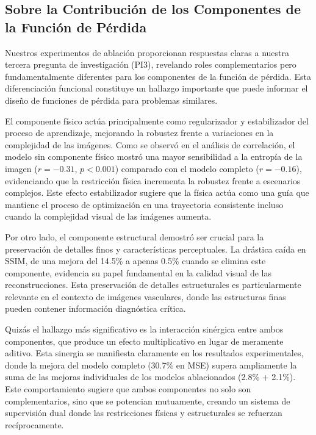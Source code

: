 \subsection{Sobre la Contribución de los Componentes de la Función de Pérdida}

Nuestros experimentos de ablación proporcionan respuestas claras a nuestra tercera pregunta de investigación (PI3), revelando roles complementarios pero fundamentalmente diferentes para los componentes de la función de pérdida. Esta diferenciación funcional constituye un hallazgo importante que puede informar el diseño de funciones de pérdida para problemas similares.

El componente físico actúa principalmente como regularizador y estabilizador del proceso de aprendizaje, mejorando la robustez frente a variaciones en la complejidad de las imágenes. Como se observó en el análisis de correlación, el modelo sin componente físico mostró una mayor sensibilidad a la entropía de la imagen ($r=-0.31$, $p<0.001$) comparado con el modelo completo ($r=-0.16$), evidenciando que la restricción física incrementa la robustez frente a escenarios complejos. Este efecto estabilizador sugiere que la física actúa como una guía que mantiene el proceso de optimización en una trayectoria consistente incluso cuando la complejidad visual de las imágenes aumenta.

Por otro lado, el componente estructural demostró ser crucial para la preservación de detalles finos y características perceptuales. La drástica caída en SSIM, de una mejora del 14.5\% a apenas 0.5\% cuando se elimina este componente, evidencia su papel fundamental en la calidad visual de las reconstrucciones. Esta preservación de detalles estructurales es particularmente relevante en el contexto de imágenes vasculares, donde las estructuras finas pueden contener información diagnóstica crítica.

Quizás el hallazgo más significativo es la interacción sinérgica entre ambos componentes, que produce un efecto multiplicativo en lugar de meramente aditivo. Esta sinergia se manifiesta claramente en los resultados experimentales, donde la mejora del modelo completo (30.7\% en MSE) supera ampliamente la suma de las mejoras individuales de los modelos ablacionados (2.8\% + 2.1\%). Este comportamiento sugiere que ambos componentes no solo son complementarios, sino que se potencian mutuamente, creando un sistema de supervisión dual donde las restricciones físicas y estructurales se refuerzan recíprocamente.

